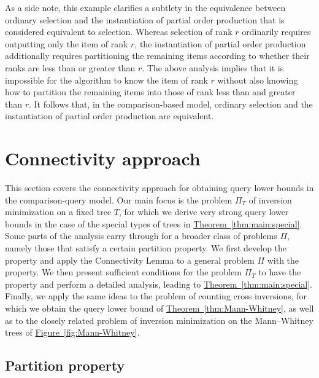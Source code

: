 \documentclass[11pt]{article}
\numberwithin{equation}{section}
\theoremstyle{definition}
\theoremstyle{plain}
\newcommand{\expref}[2]{\hyperref[#2]{#1~\ref{#2}}}
\begin{document}
As a side note, this example clarifies a subtlety in the equivalence between ordinary selection and the instantiation of partial order production that is considered equivalent to selection. Whereas selection of rank $r$ ordinarily requires outputting only the item
of rank $r$, the instantiation of partial order production additionally requires partitioning the remaining items according to whether their ranks are less than or greater than $r$. The above analysis implies that it is impossible for the algorithm to know the item of rank $r$ without also knowing how to partition the remaining items into those of rank less than and greater than $r$. It follows that, in the comparison-based model, ordinary selection and the instantiation of partial order production are equivalent. 



\section{Connectivity approach}
\label{sec:connectivity:both}

This section covers the connectivity approach for obtaining query lower bounds in the comparison-query model. Our main focus is the problem $\Pi_T$ of inversion minimization on a fixed tree $T$, for which we derive very strong query lower bounds in the case of the special types of trees in \expref{Theorem}{thm:main:special}. Some parts of the analysis carry through for a broader class of problems $\Pi$, namely those that satisfy a certain partition property. We first develop the property and apply the Connectivity Lemma to a general
%
problem $\Pi$ with the property. We then present sufficient conditions for the problem $\Pi_T$ to have the property and perform a detailed analysis, leading to \expref{Theorem}{thm:main:special}. Finally, we apply the same ideas to the problem of counting cross inversions, for which we obtain the query lower bound of \expref{Theorem}{thm:Mann-Whitney}, as well as to the closely related problem of inversion minimization on the Mann--Whitney trees of \expref{Figure}{fig:Mann-Whitney}.

\subsection{Partition property}
\end{document}
